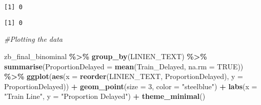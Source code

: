 \documentclass[
]{article}
\newenvironment{Shaded}{\begin{snugshade}}{\end{snugshade}}
\newcommand{\AttributeTok}[1]{\textcolor[rgb]{0.13,0.29,0.53}{#1}}
\newcommand{\CommentTok}[1]{\textcolor[rgb]{0.56,0.35,0.01}{\textit{#1}}}
\newcommand{\ConstantTok}[1]{\textcolor[rgb]{0.56,0.35,0.01}{#1}}
\newcommand{\DecValTok}[1]{\textcolor[rgb]{0.00,0.00,0.81}{#1}}
\newcommand{\FunctionTok}[1]{\textcolor[rgb]{0.13,0.29,0.53}{\textbf{#1}}}
\newcommand{\NormalTok}[1]{#1}
\newcommand{\OtherTok}[1]{\textcolor[rgb]{0.56,0.35,0.01}{#1}}
\newcommand{\SpecialCharTok}[1]{\textcolor[rgb]{0.81,0.36,0.00}{\textbf{#1}}}
\newcommand{\StringTok}[1]{\textcolor[rgb]{0.31,0.60,0.02}{#1}}
\begin{document}
\begin{verbatim}
[1] 0
\end{verbatim}

\begin{Shaded}
\end{Shaded}

\begin{verbatim}
[1] 0
\end{verbatim}

\begin{Shaded}
\end{Shaded}

\begin{Shaded}
\begin{Highlighting}[]
\CommentTok{\#Plotting the data}

\NormalTok{zb\_final\_binominal }\SpecialCharTok{\%\textgreater{}\%}
  \FunctionTok{group\_by}\NormalTok{(LINIEN\_TEXT) }\SpecialCharTok{\%\textgreater{}\%}
  \FunctionTok{summarise}\NormalTok{(}\AttributeTok{ProportionDelayed =} \FunctionTok{mean}\NormalTok{(Train\_Delayed, }\AttributeTok{na.rm =} \ConstantTok{TRUE}\NormalTok{)) }\SpecialCharTok{\%\textgreater{}\%}
  \FunctionTok{ggplot}\NormalTok{(}\FunctionTok{aes}\NormalTok{(}\AttributeTok{x =} \FunctionTok{reorder}\NormalTok{(LINIEN\_TEXT, ProportionDelayed), }\AttributeTok{y =}\NormalTok{ ProportionDelayed)) }\SpecialCharTok{+}
  \FunctionTok{geom\_point}\NormalTok{(}\AttributeTok{size =} \DecValTok{3}\NormalTok{, }\AttributeTok{color =} \StringTok{"steelblue"}\NormalTok{) }\SpecialCharTok{+}
  \FunctionTok{labs}\NormalTok{(}\AttributeTok{x =} \StringTok{"Train Line"}\NormalTok{, }\AttributeTok{y =} \StringTok{"Proportion Delayed"}\NormalTok{) }\SpecialCharTok{+}
  \FunctionTok{theme\_minimal}\NormalTok{()}
\end{Highlighting}
\end{Shaded}
\end{document}
